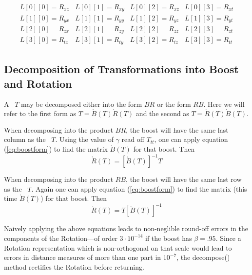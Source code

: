 \begin{eqnarray}
\label{eq:ltsubscript}
\begin{array}{llll}
  L [0] [0] = R_{xx} & L [0] [1] = R_{xy} &
  L [0] [2] = R_{xz} & L [0] [3] = R_{xt} \\
\nonumber
  L [1] [0] = R_{yx} & L [1] [1] = R_{yy} &
  L [1] [2] = R_{yz} & L [1] [3] = R_{yt} \\
\nonumber
  L [2] [0] = R_{zx} & L [2] [1] = R_{zy} &
  L [2] [2] = R_{zz} & L [2] [3] = R_{zt} \\
\nonumber
  L [3] [0] = R_{tx} & L [3] [1] = R_{ty} &
  L [3] [2] = R_{tz} & L [3] [3] = R_{tt} 
\end{array}
\end{eqnarray}

\subsection{Decomposition of Transformations into Boost and Rotation}

A \LT\ $T$ may be decomposed either into the form $ B R $ or the form
$ R B $.  Here we will refer to the 
first form as $T = \acute{B}(T) \grave{R}(T)$
and the second as $T = \acute{R}(T) \grave{B}(T)$.

When decomposing into the product $ B R $, the boost
will have the same last column as the \LT\ $T$.  Using the value of
$\gamma$ read off $T_{tt}$, one can apply equation (\ref{eq:boostform}) to
find the matrix $\acute{B}(T)$ for that boost.  Then
\begin{equation}
\label{eq:decomBR}
  \grave{R}(T) = \left[ \acute{B}(T) \right] ^{-1} T
\end{equation}

When decomposing into the product $ R B $, the boost
will have the same last row as the \LT\ $T$.  Again
one can apply equation (\ref{eq:boostform}) to
find the matrix (this time $\grave{B}(T)$) for that boost.  Then
\begin{equation}
\label{eq:decomRB}
  \acute{R}(T) = T \left[ \grave{B}(T) \right] ^{-1}
\end{equation}

Naively applying the above equations leads to non-neglible round-off errors 
in the components of the Rotation---of order $3 \cdot 10^{-14}$ if the
boost has $\beta = .95$.
Since a Rotation representation which is non-orthogonal on that scale would 
lead to errors in distance measures of more than one part in $10^{-7}$,
the decompose() method rectifies the Rotation before returning.

